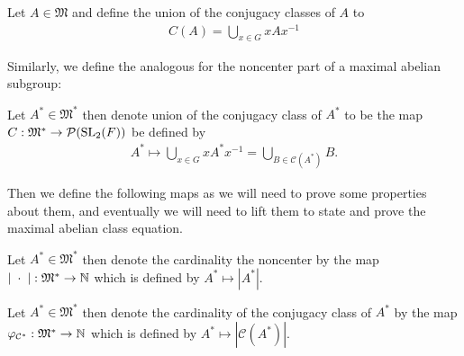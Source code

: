 \begin{footnotesize}
\begin{definition}
\label{C}
\leanok
Let $A \in \mathfrak{M}$ and define the union of the conjugacy classes of $A$ to
\begin{align*} 
  C(A) = \bigcup_{x \in G} x A x^{-1}
\end{align*}
\end{definition}


Similarly, we define the analogous for the noncenter part of a maximal abelian subgroup:

\begin{definition}
  \label{noncenter_C}
  \leanok
  Let $A^* \in \mathfrak{M}^*$ then denote union of the conjugacy class of $A^*$ to be the
  map $C : \mathfrak{M}^* \rightarrow \mathcal{P}(\operatorname{SL}_2(F))$ be defined by
\begin{align*}
  A^* \mapsto \bigcup_{x \in G} x A^* x^{-1} = \bigcup_{B \in \mathcal{C}(A^*)} B.
\end{align*}
\end{definition}


Then we define the following maps as we will need to prove some properties about them, and eventually we will need to lift them to
state and prove the maximal abelian class equation.


\begin{definition}
  \label{card_noncenter}
  \leanok
  Let $A^* \in \mathfrak{M}^*$ then denote the cardinality the noncenter 
  by the map $| \; \cdot \; | : \mathfrak{M}^* \rightarrow \mathbb{N}$ which is defined by $A^* \mapsto |A^*|$.
\end{definition}


\begin{definition}
  \label{card_noncenter_ConjClassOfSet}
  \leanok
  Let $A^* \in \mathfrak{M}^*$ then denote the cardinality of the conjugacy class of $A^*$
  by the map $\varphi_{\mathcal{C}^*} : \mathfrak{M}^* \rightarrow \mathbb{N}$  which is defined by $A^* \mapsto |\mathcal{C}(A^*)|$.
\end{definition}



\end{footnotesize}
